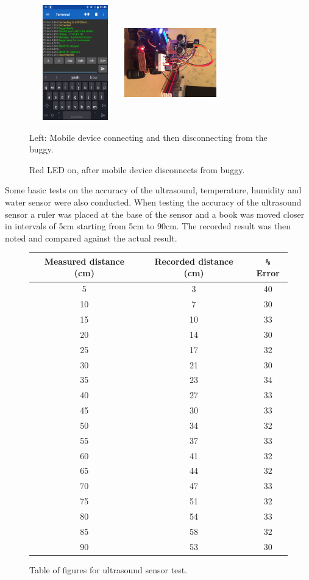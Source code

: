 \documentclass[8pt, a4paper]{article}
\begin{document}
\begin{figure}[H]
	\centering
	\includegraphics[height=5.0cm, width=4.0cm]{red_led_disconnect}
	\includegraphics[height=5.0cm, width=4.0cm, angle=90, origin=c]{red_led}
	\caption{Left: Mobile device connecting and then disconnecting from the buggy.}
	\caption{Red LED on, after mobile device disconnects from buggy.}
\end{figure} 

Some basic tests on the accuracy of the ultrasound, temperature, humidity and water sensor were also conducted. When testing the accuracy of the ultrasound sensor a ruler was placed at the base of the sensor and a book was moved closer in intervals of 5cm starting from 5cm to 90cm. The recorded result was then noted and compared against the actual result. 

\begin{figure}[H]
	\centering
	\begin{tabular}{|c|c|c|}
		\hline
		Measured distance (cm) & Recorded distance (cm) & \verb|%| Error\\
		\hline
		 5 & 3 & 40 \\   
		 10 & 7 & 30\\
		 15 & 10 & 33 \\
		 20 & 14 & 30\\
		 25 & 17 & 32\\
		 30 & 21 & 30\\
		 35 & 23 & 34\\
		 40 & 27 & 33\\
		 45 & 30 & 33\\
		 50 & 34 & 32\\
		 55 & 37 & 33\\
		 60 & 41 & 32\\
		 65 & 44 & 32\\
 		 70 & 47 & 33\\
		 75 & 51 & 32\\
		 80 & 54 & 33\\
		 85 & 58 & 32\\
		 90 & 53 & 30\\
		\hline
	\end{tabular}
	\caption{Table of figures for ultrasound sensor test.}
\end{figure}
\end{document}
